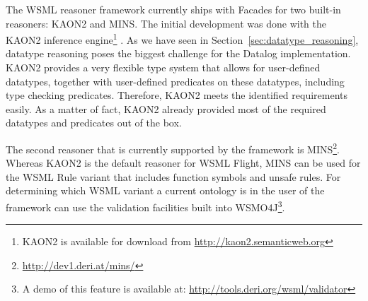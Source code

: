 The WSML reasoner framework currently ships with Facades for two
built-in reasoners: KAON2 and MINS. The initial development was done
with the KAON2 inference engine\footnote{KAON2 is available for
download from \url{http://kaon2.semanticweb.org}}
\cite{hustadt04reducing}. As we have seen in
Section~\ref{sec:datatype_reasoning}, datatype reasoning poses the
biggest challenge for the Datalog implementation. KAON2 provides a
very flexible type system that allows for user-defined datatypes,
together with user-defined predicates on these datatypes, including
type checking predicates. Therefore, KAON2 meets the identified
requirements easily. As a matter of fact, KAON2 already provided
most of the required datatypes and predicates out of the box.

The second reasoner that is currently supported by the framework is
MINS\footnote{\url{http://dev1.deri.at/mins/}}. Whereas KAON2 is the
default reasoner for WSML Flight, MINS can be used for the WSML Rule
variant that includes function symbols and unsafe rules. For
determining which WSML variant a current ontology is in the user of
the framework can use the validation facilities built into
WSMO4J\footnote{A demo of this feature is available at:
\url{http://tools.deri.org/wsml/validator}}.
